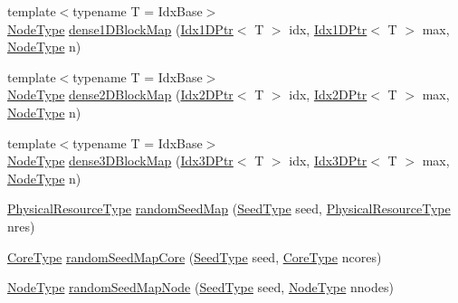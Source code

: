 \begin{DoxyCompactItemize}
\item 
{\footnotesize template$<$typename T  = Idx\+Base$>$ }\\\hyperlink{namespacevt_a866da9d0efc19c0a1ce79e9e492f47e2}{Node\+Type} \hyperlink{namespacevt_1_1mapping_a2d49151f03d4ce393b01c620f6b18517}{dense1\+D\+Block\+Map} (\hyperlink{namespacevt_1_1mapping_a8b576cf2f31069778e4951f64bccafd8}{Idx1\+D\+Ptr}$<$ T $>$ idx, \hyperlink{namespacevt_1_1mapping_a8b576cf2f31069778e4951f64bccafd8}{Idx1\+D\+Ptr}$<$ T $>$ max, \hyperlink{namespacevt_a866da9d0efc19c0a1ce79e9e492f47e2}{Node\+Type} n)
\item 
{\footnotesize template$<$typename T  = Idx\+Base$>$ }\\\hyperlink{namespacevt_a866da9d0efc19c0a1ce79e9e492f47e2}{Node\+Type} \hyperlink{namespacevt_1_1mapping_aca20bcd20c24f4a43e217ca63bf5812c}{dense2\+D\+Block\+Map} (\hyperlink{namespacevt_1_1mapping_a6832cbb1361fe72fd7ec730e7b7773b3}{Idx2\+D\+Ptr}$<$ T $>$ idx, \hyperlink{namespacevt_1_1mapping_a6832cbb1361fe72fd7ec730e7b7773b3}{Idx2\+D\+Ptr}$<$ T $>$ max, \hyperlink{namespacevt_a866da9d0efc19c0a1ce79e9e492f47e2}{Node\+Type} n)
\item 
{\footnotesize template$<$typename T  = Idx\+Base$>$ }\\\hyperlink{namespacevt_a866da9d0efc19c0a1ce79e9e492f47e2}{Node\+Type} \hyperlink{namespacevt_1_1mapping_a91764d84e5e6d8253872740cb8424726}{dense3\+D\+Block\+Map} (\hyperlink{namespacevt_1_1mapping_aacc737158b6517f2d760ffc8d1b5abca}{Idx3\+D\+Ptr}$<$ T $>$ idx, \hyperlink{namespacevt_1_1mapping_aacc737158b6517f2d760ffc8d1b5abca}{Idx3\+D\+Ptr}$<$ T $>$ max, \hyperlink{namespacevt_a866da9d0efc19c0a1ce79e9e492f47e2}{Node\+Type} n)
\item 
\hyperlink{namespacevt_a2dc36fcada816dc6d11774d650328ee9}{Physical\+Resource\+Type} \hyperlink{namespacevt_1_1mapping_ab517203040d5d053a2293de5ea58bcf1}{random\+Seed\+Map} (\hyperlink{namespacevt_ae2e13198bdef4d5b8e603d6c1c7f0969}{Seed\+Type} seed, \hyperlink{namespacevt_a2dc36fcada816dc6d11774d650328ee9}{Physical\+Resource\+Type} nres)
\item 
\hyperlink{namespacevt_a74b11b22c02feaabab8591acc87c7c52}{Core\+Type} \hyperlink{namespacevt_1_1mapping_a35fdd9ccfcee759a8c0ba29b5c61d2a5}{random\+Seed\+Map\+Core} (\hyperlink{namespacevt_ae2e13198bdef4d5b8e603d6c1c7f0969}{Seed\+Type} seed, \hyperlink{namespacevt_a74b11b22c02feaabab8591acc87c7c52}{Core\+Type} ncores)
\item 
\hyperlink{namespacevt_a866da9d0efc19c0a1ce79e9e492f47e2}{Node\+Type} \hyperlink{namespacevt_1_1mapping_accca64daff113b58cd733710ab4e0854}{random\+Seed\+Map\+Node} (\hyperlink{namespacevt_ae2e13198bdef4d5b8e603d6c1c7f0969}{Seed\+Type} seed, \hyperlink{namespacevt_a866da9d0efc19c0a1ce79e9e492f47e2}{Node\+Type} nnodes)
\end{DoxyCompactItemize}


